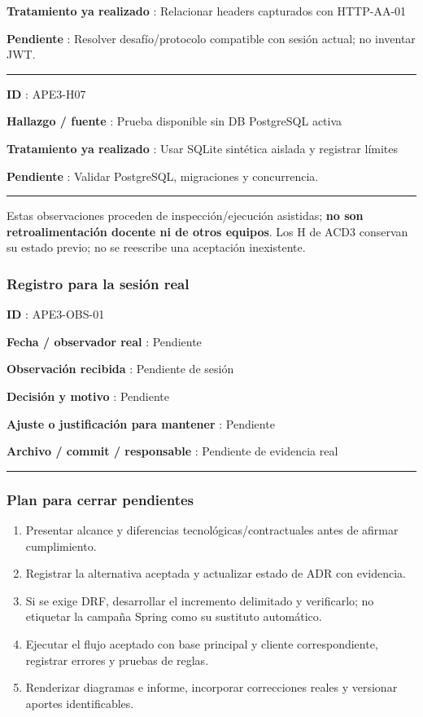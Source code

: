\documentclass[11pt,a4paper]{article}
\providecommand{\tightlist}{\setlength{\itemsep}{0pt}\setlength{\parskip}{0pt}}
\begin{document}
\textbf{Tratamiento ya realizado }: Relacionar headers capturados con
HTTP-AA-01

\textbf{Pendiente }: Resolver desafío/protocolo compatible con sesión
actual; no inventar JWT.

\medskip\hrule\medskip

\textbf{ID }: APE3-H07

\textbf{Hallazgo / fuente }: Prueba disponible sin DB PostgreSQL activa

\textbf{Tratamiento ya realizado }: Usar SQLite sintética aislada y
registrar límites

\textbf{Pendiente }: Validar PostgreSQL, migraciones y concurrencia.

\medskip\hrule\medskip

Estas observaciones proceden de inspección/ejecución asistidas;
\textbf{no son retroalimentación docente ni de otros equipos}. Los H de
ACD3 conservan su estado previo; no se reescribe una aceptación
inexistente.

\subsubsection{Registro para la sesión
real}\label{obs-registro-para-la-sesiuxf3n-real}

\textbf{ID }: APE3-OBS-01

\textbf{Fecha / observador real }: Pendiente

\textbf{Observación recibida }: Pendiente de sesión

\textbf{Decisión y motivo }: Pendiente

\textbf{Ajuste o justificación para mantener }: Pendiente

\textbf{Archivo / commit / responsable }: Pendiente de evidencia real

\medskip\hrule\medskip

\subsubsection{Plan para cerrar
pendientes}\label{obs-plan-para-cerrar-pendientes}

\begin{enumerate}
\def\labelenumi{\arabic{enumi}.}
\tightlist
\item
  Presentar alcance y diferencias tecnológicas/contractuales antes de
  afirmar cumplimiento.
\item
  Registrar la alternativa aceptada y actualizar estado de ADR con
  evidencia.
\item
  Si se exige DRF, desarrollar el incremento delimitado y verificarlo;
  no etiquetar la campaña Spring como su sustituto automático.
\item
  Ejecutar el flujo aceptado con base principal y cliente
  correspondiente, registrar errores y pruebas de reglas.
\item
  Renderizar diagramas e informe, incorporar correcciones reales y
  versionar aportes identificables.
\end{enumerate}
\end{document}
